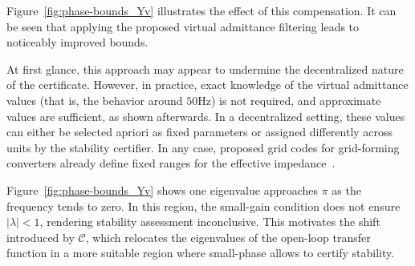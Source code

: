 Figure~\ref{fig:phase-bounds_Yv} illustrates the effect of this compensation. It can be seen that applying the proposed virtual admittance filtering leads to noticeably improved bounds.

At first glance, this approach may appear to undermine the decentralized nature of the certificate. However, in practice, exact knowledge of the virtual admittance values (that is, the behavior around $50$Hz) is not required, and approximate values are sufficient, as shown afterwards. In a decentralized setting, these values can either be selected apriori as fixed parameters or assigned differently across units by the stability certifier. In any case, proposed grid codes for grid-forming converters already define fixed ranges for the effective impedance~\cite{entsoe}. 
\begin{rem}
Figure~\ref{fig:phase-bounds_Yv} shows one eigenvalue approaches $\pi$ as the frequency tends to zero. In this region, the small-gain condition does not ensure $|\lambda|<1$, rendering stability assessment inconclusive. This motivates the shift introduced by $\mathcal{C}$, which relocates the eigenvalues of the open-loop transfer function in a more suitable region where small-phase allows to certify stability.%
\end{rem}

